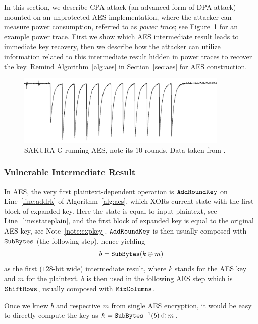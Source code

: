 In this section, we describe CPA attack (an advanced form of DPA attack) mounted on an unprotected AES implementation, where the attacker can measure power consumption, referred to as {\em power trace}; see Figure~\ref{fig:powertrace} for an example power trace. First we show which AES intermediate result leads to immediate key recovery, then we describe how the attacker can utilize information related to this intermediate result hidden in power traces to recover the key. Remind Algorithm~\ref{alg:aes} in Section~\ref{sec:aes} for AES construction.

\begin{figure}[h]
\begin{center}
	\includegraphics[width=0.9\textwidth]{./figures/power_trace/power_trace.png}
	\caption{SAKURA-G running AES, note its $10$ rounds. Data taken from \cite{exampletraces}.}
	\label{fig:powertrace}
\end{center}
\end{figure}

\subsubsection{Vulnerable Intermediate Result}
	
	In AES, the very first plaintext-dependent operation is $\texttt{AddRoundKey}$ on Line~\ref{line:addrk} of Algorithm~\ref{alg:aes}, which XORs current state with the first block of expanded key. Here the state is equal to input plaintext, see Line~\ref{line:stateplain}, and the first block of expanded key is equal to the original AES key, see Note~\ref{note:expkey}. $\texttt{AddRoundKey}$ is then usually composed with $\texttt{SubBytes}$ (the following step), hence yielding
	\begin{equation}
	\label{eq:byprod}
		b = \texttt{SubBytes}(k\oplus m)
	\end{equation}
	as the first ($128$-bit wide) intermediate result, where $k$ stands for the AES key and $m$ for the plaintext. $b$ is then used in the following AES step which is $\texttt{ShiftRows}$, usually composed with $\texttt{MixColumns}$.
		
	Once we knew $b$ and respective $m$ from single AES encryption, it would be easy to directly compute the key as $k = {\texttt{SubBytes}}^{-1}(b)\oplus m$.


